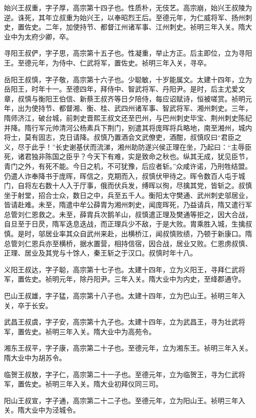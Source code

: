 \documentclass[]{article}
\begin{document}
始兴王叔重，字子厚，高宗第十四子也。性质朴，无伎艺。高宗崩，始兴王叔陵为逆。诛死，其年立叔重为始兴王，以奉昭烈王后。至德元年，为仁威将军、扬州刺史，置佐史。二年，加使持节、都督江州诸军事、江州刺史。祯明三年入关。隋大业中为太府少卿，卒。

寻阳王叔俨，字子思，高宗第十五子也。性凝重，举止方正。后主即位，立为寻阳王。至德元年，为侍中、仁武将军，置佐史。祯明三年入关，寻卒。

岳阳王叔慎，字子敬，高宗第十六子也。少聪敏，十岁能属文。太建十四年，立为岳阳王，时年十一。至德四年，拜侍中、智武将军、丹阳尹。是时，后主尤爱文章，叔慎与衡阳王伯信、新蔡王叔齐等日夕陪侍，每应诏赋诗，恒被嗟赏。祯明元年，出为使持节、都督湘、衡、桂、武四州诸军事、智武将军、湘州刺史。三年，隋师济江，破台城，前刺史晋熙王叔文还至巴州，与巴州刺史毕宝、荆州刺史陈纪并降。隋行军元帅清河公杨素兵下荆门，别遣其将庞晖将兵略地，南至湘州，城内将士，莫有固志，克日请降。叔慎乃置酒会文武僚吏，酒酣，叔慎叹曰``君臣之义，尽于此乎！''长史谢基伏而流涕，湘州助防遂兴侯正理在坐，乃起曰：``主辱臣死，诸君独非陈国之臣乎？今天下有难，实是致命之秋也。纵其无成，犹见臣节，青门之外，有死不能。今日之机，不可犹豫，后应者斩。''众咸许诺，乃刑牲结盟。仍遣人诈奉降书于庞晖，晖信之，克期而入，叔慎伏甲待之。晖令数百人屯于城门，自将左右数十人入于厅事，俄而伏兵发，缚晖以徇，尽擒其党，皆斩之。叔慎坐于射堂，招合士众，数日之中，兵至五千人。衡阳太守樊通、武州刺史邬居业，皆请赴难。未至，隋遣中牟公薛胄为湘州刺史，闻庞晖死，乃益请兵，隋又遣行军总管刘仁恩救之。未至，薛胄兵次鹅羊山，叔慎遣正理及樊通等拒之，因大合战，自旦至于日昃，隋军迭息迭战，而正理兵少不敌，于是大败。胄乘胜入城，生擒叔慎。是时，邬居业率其众自武州来赴，出横桥江，闻叔慎败绩，乃顿于新康口。隋总管刘仁恩兵亦至横桥，据水置营，相持信宿，因合战，居业又败。仁恩虏叔慎、正理、居业及其党与十馀人，秦王斩之于汉口。叔慎时年十八。

义阳王叔达，字子聪，高宗第十七子也。太建十四年，立为义阳王，寻拜仁武将军，置佐史。祯明元年，除丹阳尹。三年入关。隋大业中为内史，至绛郡通守。

巴山王叔雄，字子猛，高宗第十八子也。太建十四年，立为巴山王。祯明三年入关，卒于长安。

武昌王叔虞，字子安，高宗第十九子也。太建十四年，立为武昌王，寻为壮武将军，置佐史。祯明三年入关。隋大业中为高苑令。

湘东王叔平，字子康，高宗第二十子也。至德元年，立为湘东王。祯明三年入关。隋大业中为胡苏令。

临贺王叔敖，字子仁，高宗第二十一子也。至德元年，立为临贺王，寻为仁武将军，置佐史。祯明三年入关。隋大业初拜仪同三司。

阳山王叔宣，字子通，高宗第二十二子也。至德元年，立为阳山王。祯明三年入关。隋大业中为泾城令。
\end{document}
